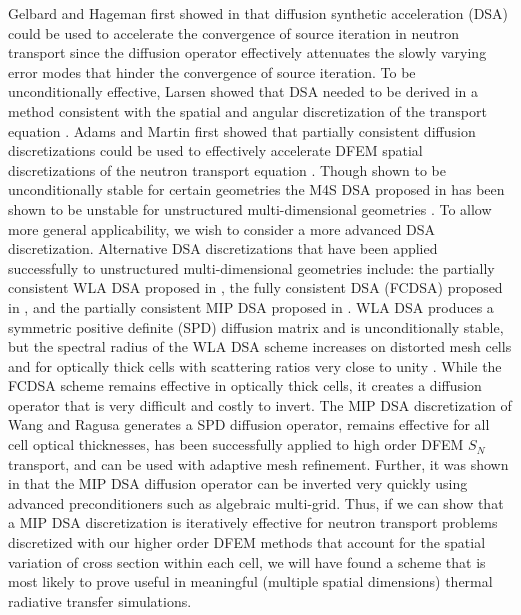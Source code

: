 Gelbard and Hageman first showed in \cite{old_dsa} that diffusion synthetic acceleration (DSA) could be used to accelerate the convergence of source iteration in neutron transport since the diffusion operator effectively attenuates the slowly varying error modes that hinder the convergence of source iteration.
To be unconditionally effective, Larsen showed that DSA needed to be derived in a method consistent with the spatial and angular discretization of the transport equation \cite{larsen_dsa}.
Adams and Martin first showed that partially consistent diffusion discretizations could be used to effectively accelerate DFEM spatial discretizations of the neutron transport equation \cite{adams_dsa}.
Though shown to be unconditionally stable for certain geometries the M4S DSA proposed in \cite{adams_dsa} has been shown to be unstable for unstructured multi-dimensional geometries \cite{wwm_dsa}.
To allow more general applicability, we wish to consider a more advanced DSA discretization.
Alternative DSA discretizations that have been applied successfully to unstructured multi-dimensional geometries include: the partially consistent WLA DSA proposed in \cite{wla_dsa}, the fully consistent DSA (FCDSA) proposed in \cite{wwm_dsa}, and the partially consistent MIP DSA proposed in \cite{mip_dsa}.
WLA DSA produces a symmetric positive definite (SPD) diffusion matrix and is unconditionally stable, but the spectral radius of the WLA DSA scheme increases on distorted mesh cells and for optically thick cells with scattering ratios very close to unity \cite{wwm_dsa,wla_dsa}.
While the FCDSA scheme remains effective in optically thick cells, it creates a diffusion operator that is very difficult and costly to invert\cite{wwm_dsa}. 
The MIP DSA discretization \cite{mip_dsa} of Wang and Ragusa generates a SPD diffusion operator, remains effective for all cell optical thicknesses, has been successfully applied to high order DFEM $S_N$ transport, and can be used with adaptive mesh refinement.
Further, it was shown in \cite{mip_mc} that the MIP DSA diffusion operator can be inverted very quickly using advanced preconditioners such as algebraic multi-grid.
Thus, if we can show that a MIP DSA discretization is iteratively effective for neutron transport problems discretized with our higher order DFEM methods that account for the spatial variation of cross section within each cell, we will have found a scheme that is most likely to prove useful in meaningful (multiple spatial dimensions) thermal radiative transfer simulations.


